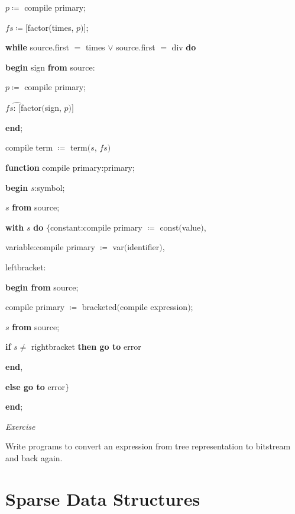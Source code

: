 \noindent
\quad \quad $p\coloneq$ compile primary;

\noindent
\quad \quad $fs \coloneq [$factor(times, $p)]$;

\noindent
\quad \quad \textbf{while} source.first $=$ times $\vee$ source.first $=$ div \textbf{do}

\noindent
\quad \quad \quad \textbf{begin} sign \textbf{from} source:

\noindent
\quad \quad \quad \quad $p\coloneq$ compile primary;

\noindent
\quad \quad \quad \quad $fs\wideparen{\text{: }[}$factor$($sign, $p)]$

\noindent
\quad \quad \quad \textbf{end};

\noindent
\quad \quad compile term $\coloneq$ term$(s$, $fs)$

\noindent
\textbf{function} compile primary:primary;

\noindent
\quad \textbf{begin} $s$:symbol;

\noindent
\quad \quad $s$ \textbf{from} source;

\noindent
\quad \quad \textbf{with} $s$ \textbf{do} $\{$constant:compile primary $\coloneq$ const$($value$)$,

\noindent
\quad \quad \quad variable:compile primary $\coloneq$ var$($identifier$)$,

\noindent
\quad \quad \quad leftbracket:

\noindent
\quad \quad \quad \textbf{begin from} source;

\noindent
\quad \quad \quad \quad compile primary $\coloneq$ bracketed$($compile expression$)$;

\noindent
\quad \quad \quad \quad $s$ \textbf{from} source;

\noindent
\quad \quad \quad \quad \textbf{if} $s \neq$ rightbracket \textbf{then go to} error

\noindent
\quad \quad \quad \textbf{end},

\noindent
\quad \quad \textbf{else go to} error$\}$

\noindent
\quad \textbf{end};

\noindent
\textit{Exercise}
\nopagebreak

\noindent
Write programs to convert an expression from tree representation to bitstream and back again.

\section[Sparse data structures]{Sparse Data Structures}
\label{sec:sparse-data-structures}

